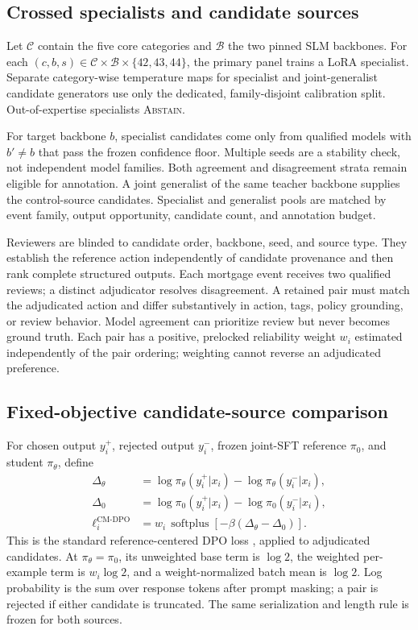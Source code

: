 \documentclass[10pt]{article}
\newcommand{\abstain}{\textsc{Abstain}}
\begin{document}
\subsection{Crossed specialists and candidate sources}

Let $\mathcal C$ contain the five core categories and $\mathcal B$ the two pinned
SLM backbones. For each
$(c,b,s)\in\mathcal C\times\mathcal B\times\{42,43,44\}$, the primary panel
trains a LoRA specialist. Separate category-wise temperature maps for specialist
and joint-generalist candidate generators use only the dedicated, family-disjoint
calibration split. Out-of-expertise specialists \abstain.

For target backbone $b$, specialist candidates come only from qualified models
with $b'\ne b$ that pass the frozen confidence floor. Multiple seeds are a
stability check, not independent model families. Both agreement and disagreement
strata remain eligible for annotation. A joint generalist of the same teacher
backbone supplies the control-source candidates. Specialist and generalist pools
are matched by event family, output opportunity, candidate count, and annotation
budget.

Reviewers are blinded to candidate order, backbone, seed, and source type. They
establish the reference action independently of candidate provenance and then
rank complete structured outputs. Each mortgage event receives two qualified
reviews; a distinct adjudicator resolves disagreement. A retained pair must
match the adjudicated action and differ substantively in action, tags, policy
grounding, or review behavior. Model agreement can prioritize review but never
becomes ground truth. Each pair has a positive, prelocked reliability weight
$w_i$ estimated independently of the pair ordering; weighting cannot reverse an
adjudicated preference.

\subsection{Fixed-objective candidate-source comparison}

For chosen output $y_i^+$, rejected output $y_i^-$, frozen joint-SFT reference
$\pi_0$, and student $\pi_\theta$, define
\begin{align}
\Delta_\theta &= \log\pi_\theta(y_i^+|x_i)-\log\pi_\theta(y_i^-|x_i),\\
\Delta_0 &= \log\pi_0(y_i^+|x_i)-\log\pi_0(y_i^-|x_i),\\
\ell_i^{\text{CM-DPO}} &= w_i\,\operatorname{softplus}
\!\left[-\beta(\Delta_\theta-\Delta_0)\right].
\end{align}
This is the standard reference-centered DPO loss
\cite{rafailov2023dpo}, applied to adjudicated candidates. At
$\pi_\theta=\pi_0$, its unweighted base term is $\log 2$, the weighted
per-example term is $w_i\log 2$, and a weight-normalized batch mean is
$\log 2$. Log probability is the sum over response tokens after prompt masking;
a pair is rejected if either candidate is truncated. The same serialization and
length rule is frozen for both sources.
\end{document}
